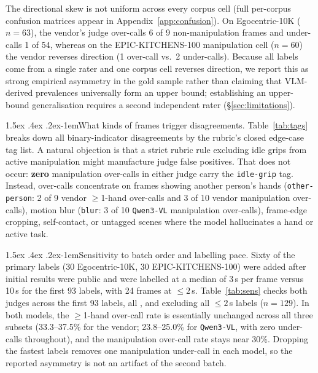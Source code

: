 \documentclass[11pt]{article}
\makeatletter
\renewcommand\paragraph{\@startsection{paragraph}{4}{\z@}%
  {1.5ex \@plus .4ex \@minus .2ex}{-1em}{\normalfont\normalsize\bfseries}}
\makeatother
\begin{document}
The directional skew is not uniform across every corpus cell (full per-corpus confusion matrices
appear in Appendix~\ref{app:confusion}). On Egocentric-10K ($n=63$), the vendor's judge over-calls
6 of 9 non-manipulation frames and under-calls 1 of 54, whereas on the EPIC-KITCHENS-100
manipulation cell ($n=60$) the vendor reverses direction (1 over-call vs.\ 2 under-calls).
Because all \vernierNPrimary{} labels come from a single rater and one corpus cell reverses
direction, we report this as strong empirical asymmetry in the gold sample rather than claiming
that VLM-derived prevalences universally form an upper bound; establishing an upper-bound
generalisation requires a second independent rater (\S\ref{sec:limitations}).

\paragraph{What kinds of frames trigger disagreements.}
Table~\ref{tab:tags} breaks down all binary-indicator disagreements by the rubric's closed
edge-case tag list. A natural objection is that a strict rubric rule excluding idle grips from
active manipulation might manufacture judge false positives. That does not occur: \textbf{zero}
manipulation over-calls in either judge carry the \texttt{idle-grip} tag. Instead, over-calls
concentrate on frames showing another person's hands (\texttt{other-person}: 2 of 9 vendor
$\geq$1-hand over-calls and 3 of 10 vendor manipulation over-calls), motion blur (\texttt{blur}:
3 of 10 \texttt{Qwen3-VL} manipulation over-calls), frame-edge cropping, self-contact, or
untagged scenes where the model hallucinates a hand or active task.

\begin{table}[t]
\centering\footnotesize

\caption{Rubric edge-case tags on judge--rater disagreements ($n = \vernierNPrimary{}$). Tags are
not mutually exclusive; ``none'' counts untagged disagreements. Zero manipulation false positives
in either judge carry the discretionary \texttt{idle-grip} tag.}
\label{tab:tags}
\end{table}

\paragraph{Sensitivity to batch order and labelling pace.}
Sixty of the \vernierNPrimary{} primary labels (30 Egocentric-10K, 30 EPIC-KITCHENS-100) were
added after initial results were public and were labelled at a median of 3\,s per frame versus
10\,s for the first 93 labels, with 24 frames at $\leq 2$\,s. Table~\ref{tab:sens} checks both
judges across the first 93 labels, all \vernierNPrimary{}, and excluding all $\leq 2$\,s labels
($n=129$). In both models, the $\geq$1-hand over-call rate is essentially unchanged across all
three subsets (33.3--37.5\% for the vendor; 23.8--25.0\% for \texttt{Qwen3-VL}, with zero
under-calls throughout), and the manipulation over-call rate stays near 30\%. Dropping the
fastest labels removes one manipulation under-call in each model, so the reported asymmetry is
not an artifact of the second batch.
\end{document}
